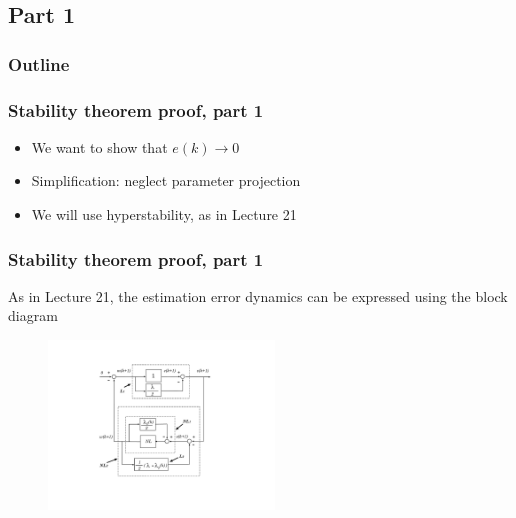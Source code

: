\subsection{Part 1}
\begin{frame}
    \frametitle{Outline}
    \tableofcontents[currentsection]
\end{frame}

\begin{frame}
    \frametitle{Stability theorem proof, part 1}

    \begin{itemize}
        \item
        We want to show that $e(k) \rightarrow 0$

        \item
        Simplification: neglect parameter projection

        \item
        We will use hyperstability, as in Lecture 21
    \end{itemize}
\end{frame}

\begin{frame}
    \frametitle{Stability theorem proof, part 1}

    As in Lecture 21, the estimation error dynamics can be expressed using the block diagram
    \begin{figure}[h]
        \centering
        \includegraphics[width=6cm]{figs_hyperstability}\\
    \end{figure}
\end{frame}

